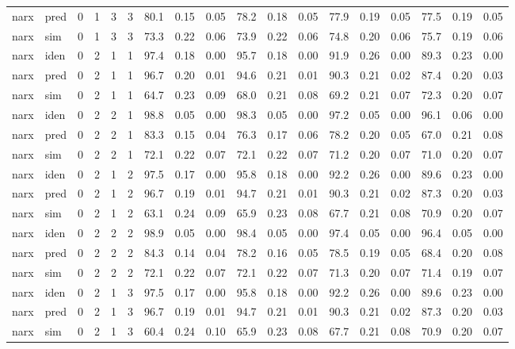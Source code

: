 \begin{landscape}
\begin{center}
\begin{longtable}{ll|cccc|ccc|ccc|ccc|ccc}
narx & pred & 0 & 1 & 3 & 3 & 80.1 & 0.15 & 0.05 & 78.2 & 0.18 & 0.05 & 77.9 & 0.19 & 0.05 & 77.5 & 0.19 & 0.05 \\ 
narx & sim  & 0 & 1 & 3 & 3 & 73.3 & 0.22 & 0.06 & 73.9 & 0.22 & 0.06 & 74.8 & 0.20 & 0.06 & 75.7 & 0.19 & 0.06 \\ 
 \hline 
narx & iden & 0 & 2 & 1 & 1 & 97.4 & 0.18 & 0.00 & 95.7 & 0.18 & 0.00 & 91.9 & 0.26 & 0.00 & 89.3 & 0.23 & 0.00 \\ 
narx & pred & 0 & 2 & 1 & 1 & 96.7 & 0.20 & 0.01 & 94.6 & 0.21 & 0.01 & 90.3 & 0.21 & 0.02 & 87.4 & 0.20 & 0.03 \\ 
narx & sim  & 0 & 2 & 1 & 1 & 64.7 & 0.23 & 0.09 & 68.0 & 0.21 & 0.08 & 69.2 & 0.21 & 0.07 & 72.3 & 0.20 & 0.07 \\ 
 \hline 
narx & iden & 0 & 2 & 2 & 1 & 98.8 & 0.05 & 0.00 & 98.3 & 0.05 & 0.00 & 97.2 & 0.05 & 0.00 & 96.1 & 0.06 & 0.00 \\ 
narx & pred & 0 & 2 & 2 & 1 & 83.3 & 0.15 & 0.04 & 76.3 & 0.17 & 0.06 & 78.2 & 0.20 & 0.05 & 67.0 & 0.21 & 0.08 \\ 
narx & sim  & 0 & 2 & 2 & 1 & 72.1 & 0.22 & 0.07 & 72.1 & 0.22 & 0.07 & 71.2 & 0.20 & 0.07 & 71.0 & 0.20 & 0.07 \\ 
 \hline 
narx & iden & 0 & 2 & 1 & 2 & 97.5 & 0.17 & 0.00 & 95.8 & 0.18 & 0.00 & 92.2 & 0.26 & 0.00 & 89.6 & 0.23 & 0.00 \\ 
narx & pred & 0 & 2 & 1 & 2 & 96.7 & 0.19 & 0.01 & 94.7 & 0.21 & 0.01 & 90.3 & 0.21 & 0.02 & 87.3 & 0.20 & 0.03 \\ 
narx & sim  & 0 & 2 & 1 & 2 & 63.1 & 0.24 & 0.09 & 65.9 & 0.23 & 0.08 & 67.7 & 0.21 & 0.08 & 70.9 & 0.20 & 0.07 \\ 
 \hline 
narx & iden & 0 & 2 & 2 & 2 & 98.9 & 0.05 & 0.00 & 98.4 & 0.05 & 0.00 & 97.4 & 0.05 & 0.00 & 96.4 & 0.05 & 0.00 \\ 
narx & pred & 0 & 2 & 2 & 2 & 84.3 & 0.14 & 0.04 & 78.2 & 0.16 & 0.05 & 78.5 & 0.19 & 0.05 & 68.4 & 0.20 & 0.08 \\ 
narx & sim  & 0 & 2 & 2 & 2 & 72.1 & 0.22 & 0.07 & 72.1 & 0.22 & 0.07 & 71.3 & 0.20 & 0.07 & 71.4 & 0.19 & 0.07 \\ 
 \hline 
narx & iden & 0 & 2 & 1 & 3 & 97.5 & 0.17 & 0.00 & 95.8 & 0.18 & 0.00 & 92.2 & 0.26 & 0.00 & 89.6 & 0.23 & 0.00 \\ 
narx & pred & 0 & 2 & 1 & 3 & 96.7 & 0.19 & 0.01 & 94.7 & 0.21 & 0.01 & 90.3 & 0.21 & 0.02 & 87.3 & 0.20 & 0.03 \\ 
narx & sim  & 0 & 2 & 1 & 3 & 60.4 & 0.24 & 0.10 & 65.9 & 0.23 & 0.08 & 67.7 & 0.21 & 0.08 & 70.9 & 0.20 & 0.07 \\ 

\end{longtable}
\end{center}
\end{landscape}
